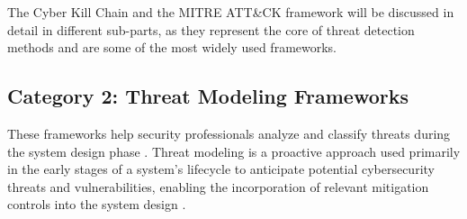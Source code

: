 The Cyber Kill Chain and the MITRE ATT\&CK framework will be discussed in detail in different sub-parts, as they represent the core of threat detection methods and are some of the most widely used frameworks.

\subsection{Category 2: Threat Modeling Frameworks}
These frameworks help security professionals analyze and classify threats during the system design phase \cite{huang2024security, ouaissa2025smartcity}. Threat modeling is a proactive approach used primarily in the early stages of a system's lifecycle to anticipate potential cybersecurity threats and vulnerabilities, enabling the incorporation of relevant mitigation controls into the system design \cite{huang2024security, owasp2024threatmodeling}.
